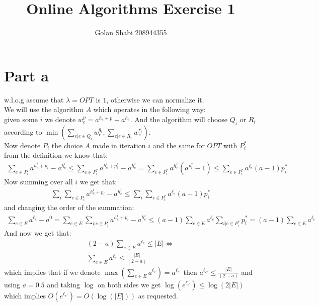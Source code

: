 \documentclass{article}
\title{Online Algorithms Exercise 1}
\author{Golan Shabi 208944355}
\begin{document}
\maketitle
\section{Part a}
w.l.o.g assume that $\lambda = OPT$ is $1$, otherwise we can normalize it.\\
We will use the algorithm $A$ which operates in the following way:\\
given some $i$ we denote $w^p_e=a^{h_e+p}-a^{h_e}$. And the algorithm will choose $Q_i$ or $R_i$ according to $\min(\sum_{e|e\in Q_i}w_e^{q_i}, \sum_{e|e\in R_i}w_e^{r_i})$.\\
Now denote $P_i$ the choice $A$ made in iteration $i$ and the same for $OPT$ with $P_i^*$  from the definition we know that:
\begin{gather*}
    \sum_{e\in P_i} a^{h^i_e+p_i} - a^{h^i_e} \leq
    \sum_{e\in P^*_i} a^{h^i_e+p^*_i} - a^{h^i_e} =
    \sum_{e\in P^*_i} a^{h^i_e}(a^{p^*_i}-1) \leq
    \sum_{e\in P^*_i} a^{\ell_e}(a-1)p^*_i
\end{gather*}
Now summing over all $i$ we get that:
\begin{gather*}
    \sum_i\sum_{e\in P_i} a^{h^i_e+p_i} - a^{h^i_e} \leq
    \sum_i\sum_{e\in P^*_i} a^{\ell_e}(a-1)p^*_i
\end{gather*}
and changing the order of the summation:
\begin{gather*}
    \sum_{e\in E}a^{\ell_e} - a^0 =
    \sum_{e\in E}\sum_{i|e\in P_i} a^{h^i_e+p_i} - a^{h^i_e} \leq
    (a-1)\sum_{e\in E}a^{\ell_e}\sum_{i|e\in P^*_i} p^*_i =
    (a-1)\sum_{e\in E}a^{\ell_e}
\end{gather*}
And now we get that:
\begin{gather*}
    (2-a)\sum_{e\in E}a^{\ell_e}\leq |E|\iff\\
    \sum_{e\in E}a^{\ell_e}\leq \frac{|E|}{(2-a)}
\end{gather*}
which implies that if we denote $\max(\sum_{e\in E}a^{\ell_e})=a^{{\ell_{e'}}}$ then $a^{\ell_{e'}}\leq \frac{|E|}{(2-a)}$ and using $a=0.5$ and taking $\log$ on both sides we get $\log(e^{\ell_{e'}})\leq \log(2|E|)$ which implies $O(e^{\ell_{e'}}) = O(\log(|E|))$ as requested.
\pagebreak
\end{document}
